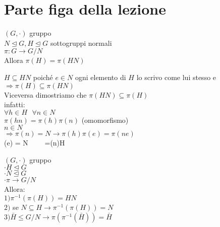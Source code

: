 \documentclass[12px]{article}
\begin{document}
	 \section{Parte figa della lezione}
	 \begin{lemm}
	 	
	 $(G,\cdot)$ gruppo\\
	 $N\trianglelefteq G, H\trianglelefteq G$ sottogruppi normali\\
	  $\pi: G \rightarrow G/N$\\
	  Allora $\pi(H) = \pi(HN)$\\
	 \end{lemm}
	  \begin{dimo}
	  	$H\subseteq HN$ poiché $e\in N$ ogni elemento di  $H$ lo scrivo come lui stesso e $ \Rightarrow \pi(H)\subseteq \pi(HN)$ \\
		Viceversa dimostriamo che $\pi(HN) \subseteq \pi(H)$\\
		infatti:\\
		 $\forall h\in H \ \ \ \forall n\in N$\\
		  $\pi(hn)=\pi(h)\pi(n)$ (omomorfismo)\\
		   $n\in N$\\
		    $ \Rightarrow \pi(n) = N \rightarrow \pi(h)\pi(e) = \pi(ne)$ \\
		    \pi(e) = N \ \ \ \ =\pi(n)\in \pi H
	  \end{dimo}
	  \newpage
	  \begin{lemm}
	  	$(G,\cdot)$ gruppo\\
		$\cdot H\trianglelefteq G$\\
		$\cdot N\trianglelefteq G$\\
		$\cdot \pi \rightarrow G/N$\\
		Allora:\\
		$1)\pi^{-1}(\pi(H))=HN$\\
		$2)$ se $N\subseteq H \rightarrow\pi^{-1}(\pi(H)) = N$\\
		$3) \bar H\leq G/N \rightarrow \pi(\pi^{-1}(\bar H)) = \bar H$

	  \end{lemm}
\end{document}

